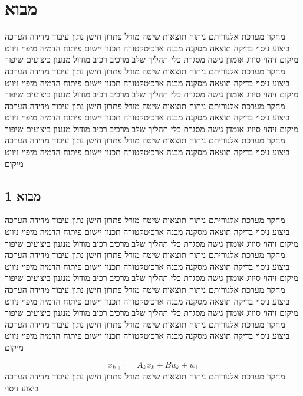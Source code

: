 \section{מבוא}
\label{sec:ch01}

מחקר מערכת אלגוריתם ניתוח תוצאות שיטה מודל פתרון חישן נתון עיבוד מדידה הערכה ביצוע ניסוי בדיקה תוצאה מסקנה מבנה ארכיטקטורה תכנון יישום פיתוח הדמיה מיפוי ניווט מיקום זיהוי סיווג אומדן גישה מסגרת כלי תהליך שלב מרכיב רכיב מודול מנגנון ביצועים שיפור מחקר מערכת אלגוריתם ניתוח תוצאות שיטה מודל פתרון חישן נתון עיבוד מדידה הערכה ביצוע ניסוי בדיקה תוצאה מסקנה מבנה ארכיטקטורה תכנון יישום פיתוח הדמיה מיפוי ניווט מיקום זיהוי סיווג אומדן גישה מסגרת כלי תהליך שלב מרכיב רכיב מודול מנגנון ביצועים שיפור מחקר מערכת אלגוריתם ניתוח תוצאות שיטה מודל פתרון חישן נתון עיבוד מדידה הערכה ביצוע ניסוי בדיקה תוצאה מסקנה מבנה ארכיטקטורה תכנון יישום פיתוח הדמיה מיפוי ניווט מיקום זיהוי סיווג אומדן גישה מסגרת כלי תהליך שלב מרכיב רכיב מודול מנגנון ביצועים שיפור מחקר מערכת אלגוריתם ניתוח תוצאות שיטה מודל פתרון חישן נתון עיבוד מדידה הערכה ביצוע ניסוי בדיקה תוצאה מסקנה מבנה ארכיטקטורה תכנון יישום פיתוח הדמיה מיפוי ניווט מיקום

\subsection{מבוא 1}
\label{sub:ch01_1}
מחקר מערכת אלגוריתם ניתוח תוצאות שיטה מודל פתרון חישן נתון עיבוד מדידה הערכה ביצוע ניסוי בדיקה תוצאה מסקנה מבנה ארכיטקטורה תכנון יישום פיתוח הדמיה מיפוי ניווט מיקום זיהוי סיווג אומדן גישה מסגרת כלי תהליך שלב מרכיב רכיב מודול מנגנון ביצועים שיפור מחקר מערכת אלגוריתם ניתוח תוצאות שיטה מודל פתרון חישן נתון עיבוד מדידה הערכה ביצוע ניסוי בדיקה תוצאה מסקנה מבנה ארכיטקטורה תכנון יישום פיתוח הדמיה מיפוי ניווט מיקום זיהוי סיווג אומדן גישה מסגרת כלי תהליך שלב מרכיב רכיב מודול מנגנון ביצועים שיפור מחקר מערכת אלגוריתם ניתוח תוצאות שיטה מודל פתרון חישן נתון עיבוד מדידה הערכה ביצוע ניסוי בדיקה תוצאה מסקנה מבנה ארכיטקטורה תכנון יישום פיתוח הדמיה מיפוי ניווט מיקום זיהוי סיווג אומדן גישה מסגרת כלי תהליך שלב מרכיב רכיב מודול מנגנון ביצועים שיפור מחקר מערכת אלגוריתם ניתוח תוצאות שיטה מודל פתרון חישן נתון עיבוד מדידה הערכה ביצוע ניסוי בדיקה תוצאה מסקנה מבנה ארכיטקטורה תכנון יישום פיתוח הדמיה מיפוי ניווט מיקום

\begin{equation}
    x_{k+1} = A_{k} x_k + B u_{k} + w_{1}
    \label{eq:ch01_1}
\end{equation}
מחקר מערכת אלגוריתם ניתוח תוצאות שיטה מודל פתרון חישן נתון עיבוד מדידה הערכה ביצוע ניסוי

